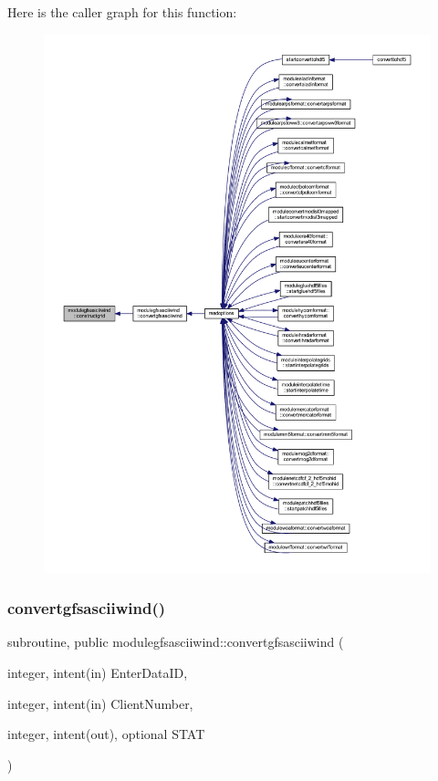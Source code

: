 Here is the caller graph for this function\+:\nopagebreak
\begin{figure}[H]
\begin{center}
\leavevmode
\includegraphics[width=350pt]{namespacemodulegfsasciiwind_a794951032db573702ba8cfba3fe3f55b_icgraph}
\end{center}
\end{figure}
\mbox{\label{namespacemodulegfsasciiwind_a4a4a0dde4375b81a03f64232de2622c5}} 
\subsubsection{\texorpdfstring{convertgfsasciiwind()}{convertgfsasciiwind()}}
{\footnotesize\ttfamily subroutine, public modulegfsasciiwind\+::convertgfsasciiwind (\begin{DoxyParamCaption}\item[{integer, intent(in)}]{Enter\+Data\+ID,  }\item[{integer, intent(in)}]{Client\+Number,  }\item[{integer, intent(out), optional}]{S\+T\+AT }\end{DoxyParamCaption})}

